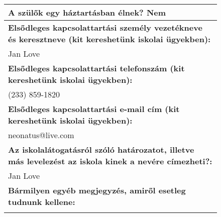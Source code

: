 \documentclass[10pt,a4paper]{article}
\begin{document}
\begin{figure}[!ht]
\begin{tabular}{|m{\textwidth}|}
\hline\vspace{3pt}
\textbf{A szülők egy háztartásban élnek? } \hspace{0.5cm} Nem \vspace{3pt} \\
\hline\vspace{3pt}
\textbf{Elsődleges kapcsolattartási személy vezetékneve és keresztneve (kit kereshetünk iskolai ügyekben):} \\ \hspace{0.5cm} Jan Love \vspace{3pt} \\
\hline\vspace{3pt}
\textbf{Elsődleges kapcsolattartási telefonszám (kit kereshetünk iskolai ügyekben):} \\ \hspace{0.5cm} (233) 859-1820 \vspace{3pt} \\
\hline\vspace{3pt}
\textbf{Elsődleges kapcsolattartási e-mail cím (kit kereshetünk iskolai ügyekben):} \\ \hspace{0.5cm} neonatus@live.com \vspace{3pt} \\
\hline\vspace{3pt}
\textbf{Az iskolalátogatásról szóló határozatot, illetve más levelezést az iskola kinek a nevére címezheti?:} \\ \hspace{0.5cm} Jan Love \vspace{3pt} \\
\hline\vspace{3pt}
\textbf{Bármilyen egyéb megjegyzés, amiről esetleg tudnunk kellene:} \\ \hspace{0.5cm}  \vspace{3pt} \\


\end{tabular}
\end{figure}
\end{document}

